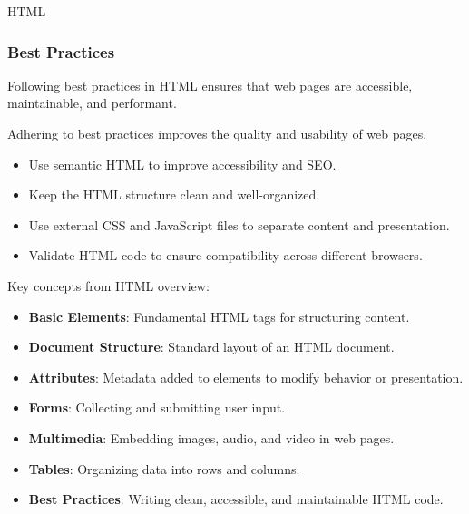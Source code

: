 \begin{notes}{HTML}
\begin{highlight}
    \end{highlight}
    
    \subsubsection*{Best Practices}
    
    Following best practices in HTML ensures that web pages are accessible, maintainable, and performant.
    
    \begin{highlight}
    
        Adhering to best practices improves the quality and usability of web pages.
        
        \begin{itemize}
            \item Use semantic HTML to improve accessibility and SEO.
            \item Keep the HTML structure clean and well-organized.
            \item Use external CSS and JavaScript files to separate content and presentation.
            \item Validate HTML code to ensure compatibility across different browsers.
        \end{itemize}
    
    \end{highlight}
    
    \begin{highlight}
    
        Key concepts from HTML overview:
        
        \begin{itemize}
            \item \textbf{Basic Elements}: Fundamental HTML tags for structuring content.
            \item \textbf{Document Structure}: Standard layout of an HTML document.
            \item \textbf{Attributes}: Metadata added to elements to modify behavior or presentation.
            \item \textbf{Forms}: Collecting and submitting user input.
            \item \textbf{Multimedia}: Embedding images, audio, and video in web pages.
            \item \textbf{Tables}: Organizing data into rows and columns.
            \item \textbf{Best Practices}: Writing clean, accessible, and maintainable HTML code.
        \end{itemize}
        
    \end{highlight}
\end{notes}

